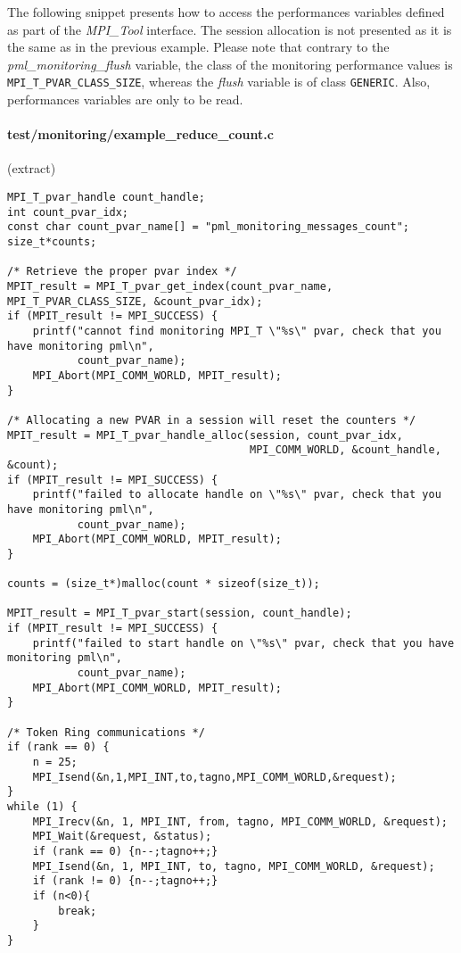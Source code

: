 \documentclass[notitlepage]{article}
\newcommand{\mpit}[1]{\textit{MPI\_Tool#1}}
\newcommand{\brkunds}[0]{\allowbreak\_}
\begin{document}
The following snippet presents how to access the performances
variables defined as part of the \mpit{} interface. The session
allocation is not presented as it is the same as in the previous
example. Please note that contrary to the {\it
  pml\brkunds{}monitoring\brkunds{}flush} variable, the class of the
monitoring performance values is {\tt
  MPI\brkunds{}T\brkunds{}PVAR\brkunds{}CLASS\brkunds{}SIZE}, whereas
the {\it flush} variable is of class {\tt GENERIC}. Also, performances
variables are only to be read.

\paragraph{test/monitoring/example\_reduce\_count.c} (extract)

\begin{verbatim}
MPI_T_pvar_handle count_handle;
int count_pvar_idx;
const char count_pvar_name[] = "pml_monitoring_messages_count";
size_t*counts;

/* Retrieve the proper pvar index */
MPIT_result = MPI_T_pvar_get_index(count_pvar_name, MPI_T_PVAR_CLASS_SIZE, &count_pvar_idx);
if (MPIT_result != MPI_SUCCESS) {
    printf("cannot find monitoring MPI_T \"%s\" pvar, check that you have monitoring pml\n",
           count_pvar_name);
    MPI_Abort(MPI_COMM_WORLD, MPIT_result);
}

/* Allocating a new PVAR in a session will reset the counters */
MPIT_result = MPI_T_pvar_handle_alloc(session, count_pvar_idx,
                                      MPI_COMM_WORLD, &count_handle, &count);
if (MPIT_result != MPI_SUCCESS) {
    printf("failed to allocate handle on \"%s\" pvar, check that you have monitoring pml\n",
           count_pvar_name);
    MPI_Abort(MPI_COMM_WORLD, MPIT_result);
}

counts = (size_t*)malloc(count * sizeof(size_t));

MPIT_result = MPI_T_pvar_start(session, count_handle);
if (MPIT_result != MPI_SUCCESS) {
    printf("failed to start handle on \"%s\" pvar, check that you have monitoring pml\n",
           count_pvar_name);
    MPI_Abort(MPI_COMM_WORLD, MPIT_result);
}

/* Token Ring communications */
if (rank == 0) {
    n = 25;
    MPI_Isend(&n,1,MPI_INT,to,tagno,MPI_COMM_WORLD,&request);
}
while (1) {
    MPI_Irecv(&n, 1, MPI_INT, from, tagno, MPI_COMM_WORLD, &request);
    MPI_Wait(&request, &status);
    if (rank == 0) {n--;tagno++;}
    MPI_Isend(&n, 1, MPI_INT, to, tagno, MPI_COMM_WORLD, &request);
    if (rank != 0) {n--;tagno++;}
    if (n<0){
        break;
    }
}


\end{verbatim}
\end{document}
